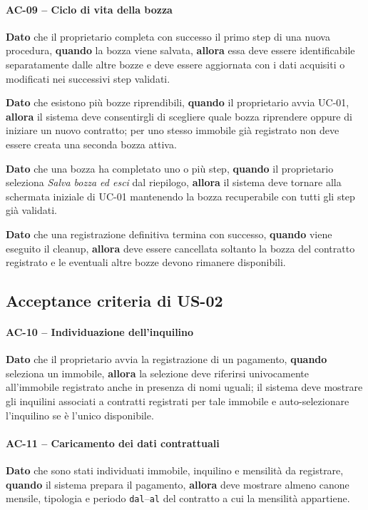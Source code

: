 \documentclass[12pt,a4paper]{article}
\begin{document}
\paragraph{AC-09 -- Ciclo di vita della bozza}
\textbf{Dato} che il proprietario completa con successo il primo step di una nuova procedura,
\textbf{quando} la bozza viene salvata,
\textbf{allora} essa deve essere identificabile separatamente dalle altre bozze e deve essere
aggiornata con i dati acquisiti o modificati nei successivi step validati.

\textbf{Dato} che esistono più bozze riprendibili,
\textbf{quando} il proprietario avvia UC-01,
\textbf{allora} il sistema deve consentirgli di scegliere quale bozza riprendere oppure di iniziare
un nuovo contratto; per uno stesso immobile già registrato non deve essere creata una seconda bozza
attiva.

\textbf{Dato} che una bozza ha completato uno o più step,
\textbf{quando} il proprietario seleziona \emph{Salva bozza ed esci} dal riepilogo,
\textbf{allora} il sistema deve tornare alla schermata iniziale di UC-01 mantenendo la bozza
recuperabile con tutti gli step già validati.

\textbf{Dato} che una registrazione definitiva termina con successo,
\textbf{quando} viene eseguito il cleanup,
\textbf{allora} deve essere cancellata soltanto la bozza del contratto registrato e le eventuali altre
bozze devono rimanere disponibili.

\subsection{Acceptance criteria di US-02}

\paragraph{AC-10 -- Individuazione dell'inquilino}
\textbf{Dato} che il proprietario avvia la registrazione di un pagamento,
\textbf{quando} seleziona un immobile,
\textbf{allora} la selezione deve riferirsi univocamente all'immobile registrato anche
in presenza di nomi uguali; il sistema deve mostrare gli inquilini associati a contratti
registrati per tale immobile e auto-selezionare l'inquilino se è l'unico disponibile.

\paragraph{AC-11 -- Caricamento dei dati contrattuali}
\textbf{Dato} che sono stati individuati immobile, inquilino e mensilità da registrare,
\textbf{quando} il sistema prepara il pagamento,
\textbf{allora} deve mostrare almeno canone mensile, tipologia e periodo
\texttt{dal}--\texttt{al} del contratto a cui la mensilità appartiene.
\end{document}

